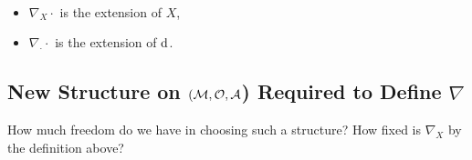 \documentclass[11pt, a4paper, twocolumn]{article} %
\begin{document}
\begin{note}~
    \begin{itemize}
        \item $\nabla_X \cdot $ is the extension of $X$,
        \item $\nabla_\cdot\cdot$ is the extension of $\operatorname{d\!}$\,.
    \end{itemize}
\end{note}
\subsection[New Structure on (M,O,A) to Define Nabla]{New Structure on $(\mathcal{M}, \mathcal{O}, \mathcal{A}$) Required to Define $\nabla$}
    How much freedom do we have in choosing such a structure? How fixed is $\nabla_X$ by the definition above?
\end{document}
